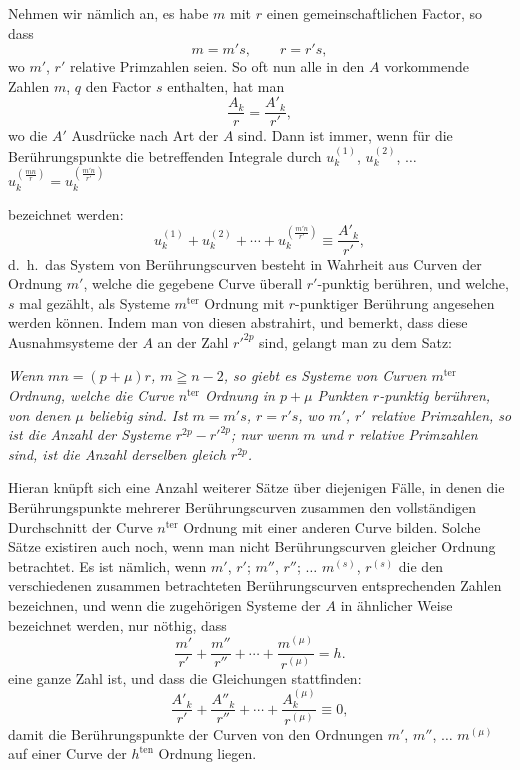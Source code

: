 \documentclass{article}
\begin{document}
Nehmen wir nämlich an, es habe $m$ mit $r$ einen gemeinschaftlichen Factor, so dass
\[ m = m's, \qquad r = r's, \]
wo $m'$, $r'$ relative Primzahlen seien. So oft nun alle in den $A$ vorkommende Zahlen $m$, $q$ den Factor $s$ enthalten, hat man
\[ \frac{A_{k}}{r} = \frac{A'_{k}}{r'}, \]
wo die $A'$ Ausdrücke nach Art der $A$ sind. Dann ist immer, wenn für die Berührungspunkte die betreffenden Integrale durch $u_{k}^{(1)}$, $u_{k}^{(2)}$, $\ldots$ $u_{k}^{\left(\frac{mn}{r}\right)} = u_{k}^{\left(\frac{m'n}{r'}\right)}$

bezeichnet werden:
\[ u_{k}^{(1)} + u_{k}^{(2)} + \cdots + u_{k}^{\left(\frac{m'n}{r'}\right)} \equiv \frac{A'_{k}}{r'}, \]
d.\ h.\ das System von Berührungscurven besteht in Wahrheit aus Curven der Ordnung $m'$, welche die gegebene Curve überall $r'$-punktig berühren, und welche, $s$ mal gezählt, als Systeme $m^{\text{ter}}$ Ordnung mit $r$-punktiger Berührung angesehen werden können. Indem man von diesen abstrahirt, und bemerkt, dass diese Ausnahmsysteme der $A$ an der Zahl $r'^{2p}$ sind, gelangt man zu dem Satz:

\emph{Wenn $mn = (p+\mu)r$, $m \geqq n-2$, so giebt es Systeme von Curven $m^{\text{ter}}$ Ordnung, welche die Curve $n^{\text{ter}}$ Ordnung in $p+\mu$ Punkten $r$-punktig berühren, von denen $\mu$ beliebig sind. Ist $m = m's$, $r = r's$, wo $m'$, $r'$ relative Primzahlen, so ist die Anzahl der Systeme $r^{2p} - r'^{2p}$; nur wenn $m$ und $r$ relative Primzahlen sind, ist die Anzahl derselben gleich $r^{2p}$.}

Hieran knüpft sich eine Anzahl weiterer Sätze über diejenigen Fälle, in denen die Berührungspunkte mehrerer Berührungscurven zusammen den vollständigen Durchschnitt der Curve $n^{\text{ter}}$ Ordnung mit einer anderen Curve bilden. Solche Sätze existiren auch noch, wenn man nicht Berührungscurven gleicher Ordnung betrachtet. Es ist nämlich, wenn $m'$, $r'$; $m''$, $r''$; $\ldots$ $m^{(s)}$, $r^{(s)}$ die den verschiedenen zusammen betrachteten Berührungscurven entsprechenden Zahlen bezeichnen, und wenn die zugehörigen Systeme der $A$ in ähnlicher Weise bezeichnet werden, nur nöthig, dass
\[ \frac{m'}{r'} + \frac{m''}{r''} + \cdots + \frac{m^{(\mu)}}{r^{(\mu)}} = h. \]
eine ganze Zahl ist, und dass die Gleichungen stattfinden:
\[ \frac{A'_{k}}{r'} + \frac{A''_{k}}{r''} + \cdots + \frac{A_{k}^{(\mu)}}{r^{(\mu)}} \equiv 0, \]
damit die Berührungspunkte der Curven von den Ordnungen $m'$, $m''$, $\ldots$ $m^{(\mu)}$ auf einer Curve der $h^{\text{ten}}$ Ordnung liegen.
\end{document}
